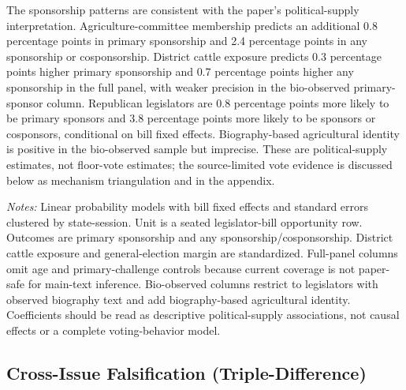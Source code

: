 \documentclass[12pt]{article}
\begin{document}
The sponsorship patterns are consistent with the paper's political-supply interpretation.  Agriculture-committee membership predicts an additional 0.8 percentage points in primary sponsorship and 2.4 percentage points in any sponsorship or cosponsorship.  District cattle exposure predicts 0.3 percentage points higher primary sponsorship and 0.7 percentage points higher any sponsorship in the full panel, with weaker precision in the bio-observed primary-sponsor column.  Republican legislators are 0.8 percentage points more likely to be primary sponsors and 3.8 percentage points more likely to be sponsors or cosponsors, conditional on bill fixed effects.  Biography-based agricultural identity is positive in the bio-observed sample but imprecise.  These are political-supply estimates, not floor-vote estimates; the source-limited vote evidence is discussed below as mechanism triangulation and in the appendix.

\begin{table}[htbp]
\centering
\begin{threeparttable}
\caption{Legislator Political Supply of Cultivated-Meat Restrictions}
\label{tab:political_supply}
{\footnotesize

}
\begin{tablenotes}[flushleft]
\footnotesize
\item \textit{Notes:} Linear probability models with bill fixed effects and standard errors clustered by state-session.  Unit is a seated legislator-bill opportunity row.  Outcomes are primary sponsorship and any sponsorship/cosponsorship.  District cattle exposure and general-election margin are standardized.  Full-panel columns omit age and primary-challenge controls because current coverage is not paper-safe for main-text inference.  Bio-observed columns restrict to legislators with observed biography text and add biography-based agricultural identity.  Coefficients should be read as descriptive political-supply associations, not causal effects or a complete voting-behavior model.
\end{tablenotes}
\end{threeparttable}
\end{table}

\subsection{Cross-Issue Falsification (Triple-Difference)}
\label{sec:results_triplediff}
\end{document}
